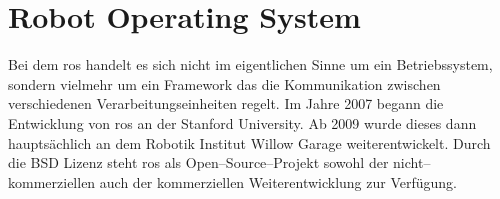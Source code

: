 \begin{comment}
------------------------------------------------------------------------------------------
- Was ist ROS?
- Von wem wurde es Entwickelt bzw. weiterentwickelt?
- Wie funktioniert ros?
- Welche Hauptkomponenten gibt es in ROS? ROSCORE, Messages (siehe ROS Summer School)
=> Maximal eine Seite

- \cite{ROSSummerSchool2017}
	- Stephan Kallweit, Patrick Wiesen, Nicolas Limpert, 
	- Packages
		- Smallest build part
		- nodes, third party software, datasets, configuration files
		- src, include, launch, config
	- Computation Graph

		- Launch Files
			- Tool to manage a robotic system
			- starting of multiple nodes
			- setting of parameter values
			- setting of arguments
			- including other launch files
		- Parameter Server
			- Global key-value store for sharing configuration informationen
		- Services
			- Request/Reply interaction between nodes is done via services
				- Request is sent by client
				- Response is generated by server
			- Providing nodes offer a service under a specific name
			- Client callsthe service by sending the request message and awaiting the reply
				- Blocking mechanism!
				- Separate connection for each call!
			- Typical use
				- Algorithms: Forward or inverse transformation
				- Closed-Loop Commands: Open gripper
			- Services are like remote function calls
			- Code waits for service call to complete
			- Use of message structures
			- Synchronous Communication
		- Bags
			- File format (*.bag) for storing and playing back messages
			- Primary mechanism for data logging
			- Important tool for analyzing, storing, visualizing data and testing algorithms
			- Using bag files within a ROS Computation Graph is generally no different from having ROS nodes send the same data
		- Transformation
			- static
			- dynamic
			- TFs are implemented with a forward description from parent to child (from → to )
			- Each child frame has a maximum of one parent frame, but a parent frame can be linked to many child frames (tree structured)
			- Listener / Broadcaster
\end{comment}
\section{Robot Operating System}

Bei dem \Gls{ros} handelt es sich nicht im eigentlichen Sinne um ein Betriebssystem, sondern vielmehr um ein Framework das die Kommunikation zwischen verschiedenen Verarbeitungseinheiten regelt. Im Jahre 2007 begann die Entwicklung von \Gls{ros} an der Stanford University. Ab 2009 wurde dieses dann hauptsächlich an dem Robotik Institut Willow Garage weiterentwickelt. Durch die BSD Lizenz steht \Gls{ros} als Open--Source--Projekt sowohl der nicht--kommerziellen auch der kommerziellen Weiterentwicklung zur Verfügung. \cite{quigley2009ros}

